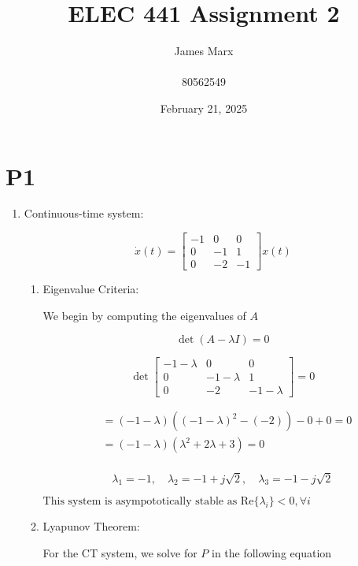 \documentclass{article}
\title{ELEC 441 Assignment 2}
\author{James Marx \\ \\ 80562549}
\date{February 21, 2025}
\begin{document}
\maketitle
\newpage

\newpage

\section*{P1}

\begin{enumerate}[label=\alph*)]
    \item Continuous-time system:

    \[
     \dot x(t) = 
    \begin{bmatrix}
        -1 & 0 & 0 \\
        0 & -1 & 1 \\
        0 & -2 & -1
    \end{bmatrix}
    x(t)
    \]

    \begin{enumerate}[label=\roman*)]
        \item Eigenvalue Criteria:

        We begin by computing the eigenvalues of $A$

        \[ \det(A - \lambda I) = 0\]

        \[
            \det \begin{bmatrix}
                -1 - \lambda & 0 & 0 \\
                0 & -1 - \lambda & 1 \\
                0 & -2 & -1 - \lambda
            \end{bmatrix} 
            = 0
        \]

        \begin{align*}
            &= (-1- \lambda)\left((-1 - \lambda)^2 - (-2)\right) - 0 + 0 = 0 \\
            &= (-1 - \lambda)(\lambda^2 + 2\lambda + 3) = 0 \\
        \end{align*}

        \[\lambda_1 = -1, \quad \lambda_2 = -1 + j\sqrt{2}, \quad \lambda_3 = -1 - j\sqrt{2}\]

        $\boxed{\text{This system is asympototically stable as $\text{Re}\{\lambda_i\} < 0, \forall i$}}$

        \item Lyapunov Theorem:

        For the CT system, we solve for $P$ in the following equation


\end{enumerate}
\end{enumerate}
\end{document}
